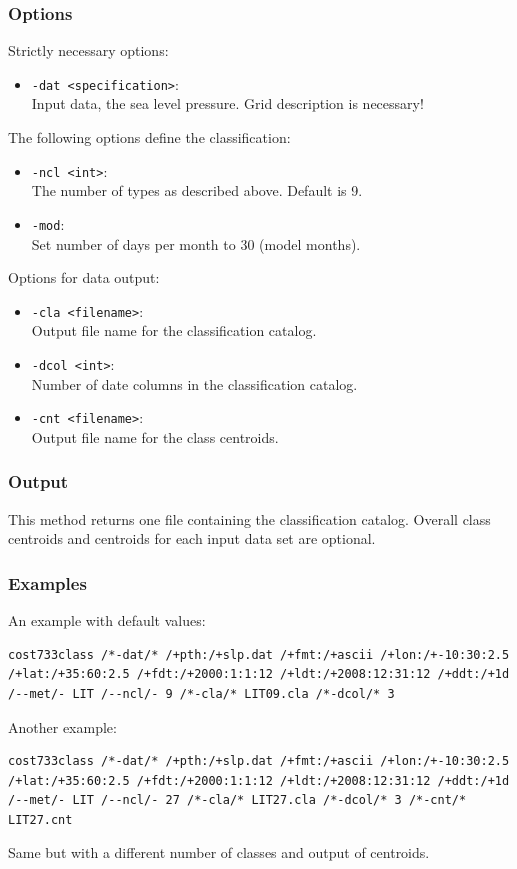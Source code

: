 \documentclass[12pt, oneside, a4paper, headsepline, plainheadsepline]{scrbook}
\begin{document}
\subsubsection*{Options}
Strictly necessary options:
\begin{itemize}
 \item \verb+-dat <specification>+:\\ Input data, the sea level pressure. Grid description is necessary!
\end{itemize}
The following options define the classification:
\begin{itemize}
 \item \verb+-ncl <int>+:\\ The number of types as described above. Default is 9.
 \item \verb+-mod+:\\ Set number of days per month to 30 (model months).
\end{itemize}
Options for data output:
\begin{itemize}
 \item \verb+-cla <filename>+:\\ Output file name for the classification catalog.
 \item \verb+-dcol <int>+:\\  Number of date columns in the classification catalog.
 \item \verb+-cnt <filename>+:\\ Output file name for the class centroids.
\end{itemize}

\subsubsection*{Output}
This method returns one file containing the classification catalog. 
Overall class centroids and centroids for each input data set are optional.

\subsubsection*{Examples}
An example with default values:
\begin{lstlisting}
cost733class /*-dat/* /+pth:/+slp.dat /+fmt:/+ascii /+lon:/+-10:30:2.5 /+lat:/+35:60:2.5 /+fdt:/+2000:1:1:12 /+ldt:/+2008:12:31:12 /+ddt:/+1d /--met/- LIT /--ncl/- 9 /*-cla/* LIT09.cla /*-dcol/* 3 
\end{lstlisting}
Another example: 
\begin{lstlisting}
cost733class /*-dat/* /+pth:/+slp.dat /+fmt:/+ascii /+lon:/+-10:30:2.5 /+lat:/+35:60:2.5 /+fdt:/+2000:1:1:12 /+ldt:/+2008:12:31:12 /+ddt:/+1d /--met/- LIT /--ncl/- 27 /*-cla/* LIT27.cla /*-dcol/* 3 /*-cnt/* LIT27.cnt
\end{lstlisting}
Same but with a different number of classes and output of centroids.
\end{document}
